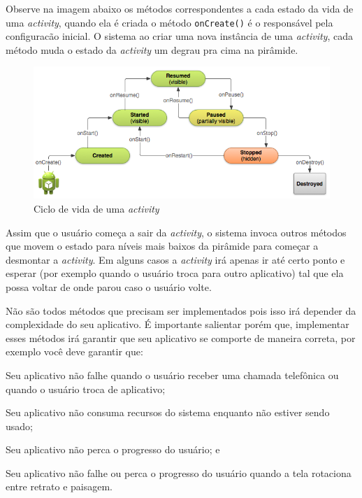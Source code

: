 \documentclass[a4paper,12pt,brazil]{book}
\begin{document}
\begin{singlespace}
Observe na imagem abaixo os métodos correspondentes a cada estado da vida de uma \emph{activity}, quando ela é criada o método \texttt{onCreate()} é o responsável pela configuracão inicial. O sistema ao criar uma nova instância de uma \emph{activity}, cada método muda o estado da \emph{activity} um degrau pra cima na pirâmide. 

\begin{figure}[H]
  \centering
  \includegraphics[width=1\textwidth]{figuras/design/basic-lifecycle.png}
  \caption{Ciclo de vida de uma \emph{activity} }
  \label{fig:e}
\end{figure}

Assim que o usuário começa a sair da \emph{activity}, o sistema invoca outros métodos que movem o estado para níveis mais baixos da pirâmide para começar a desmontar a \emph{activity}. Em alguns casos a \emph{activity} irá apenas ir até certo ponto e esperar (por exemplo quando o usuário troca para outro aplicativo) tal que ela possa voltar de onde parou caso o usuário volte. 

 Não são todos métodos que precisam ser implementados pois isso irá depender da complexidade do seu aplicativo. É importante salientar porém que, implementar esses métodos irá garantir que seu aplicativo se comporte de maneira correta, por exemplo você deve garantir que:
 \bi
 \item Seu aplicativo não falhe quando o usuário receber uma chamada telefônica ou quando o usuário troca de aplicativo;
 \item Seu aplicativo não consuma recursos do sistema enquanto não estiver sendo usado;
 \item Seu aplicativo não perca o progresso do usuário; e
 \item Seu aplicativo não falhe ou perca o progresso do usuário quando a tela rotaciona entre retrato e paisagem.
\ei


\end{singlespace}
\end{document}
